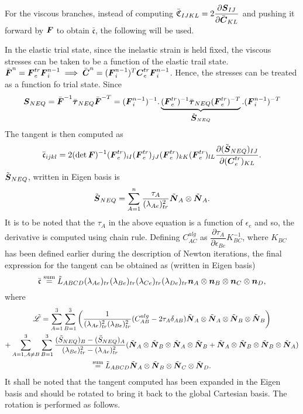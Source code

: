 \documentclass[11pt,twoside,TimesRoman]{article}
\newcommand{\parder}[2]{{\dfrac{\partial #1}{\partial #2}}}
\begin{document}
For the viscous branches, instead of computing $\bar{\mathfrak{C}}_{IJKL} = 2\parder{\bfS_{IJ}}{\bfCbar_{KL}}$ and pushing it forward by $\mbox{\boldmath $F$}$ to obtain $	\bar{\mathfrak{c}}$, the following will be used. 

In the elastic trial state, since the inelastic strain is held fixed, the viscous stresses can be taken to be a function of the elastic trail state. $\bar{\mbox{\boldmath $F$}}^n =\mbox{\boldmath $F$}_e^{tr} \mbox{\boldmath $F$}_i^{n-1} \implies \bar{\mbox{\boldmath $C$}}^n = (\mbox{\boldmath $F$}_i^{n-1})^T \mbox{\boldmath $C$}_e^{tr} \mbox{\boldmath $F$}_i^{n-1}$. Hence, the stresses can be treated as a function fo trial state. Since
\begin{equation}
	 \mbox{\boldmath $S$}_{NEQ}  = \bar{\mbox{\boldmath $F$}}^{-1} \bar{\mbox{\boldmath $\tau$}}_{NEQ} \bar{\mbox{\boldmath $F$}}^{-T} = (\mbox{\boldmath $F$}_i^{n-1})^{-1}.	 \underbrace{(\mbox{\boldmath $F$}_e^{tr})^{-1} \bar{\mbox{\boldmath $\tau$}}_{NEQ} (\mbox{\boldmath $F$}_e^{tr})^{-T}}_{\tilde{\mbox{\boldmath $S$}}_{NEQ}}  .(\mbox{\boldmath $F$}_i^{n-1})^{-T}
\end{equation}
The tangent is then computed as 
\begin{equation}
	\bar{\mathfrak{c}}_{ijkl} =2 (\det \bfF)^{-1} (\bfF_e^{tr})_{iI} (\bfF_e^{tr})_{jJ} (\bfF_e^{tr})_{kK} (\bfF_e^{tr})_{lL} \parder{(\tilde{\bfS}_{NEQ})_{IJ}}{(\bfC_e^{tr})_{KL}}.
\end{equation}
$\tilde{\mbox{\boldmath $S$}}_{NEQ}$, written in Eigen basis is
\begin{equation}
	\tilde{\mbox{\boldmath $S$}}_{NEQ} = \sum_{A=1}^{n} \frac{\tau_A}{(\lambda_{Ae})_{tr}^2} \tilde{\mbox{\boldmath $N$}}_A \otimes \tilde{\mbox{\boldmath $N$}}_A.
\end{equation}
It is to be noted that the $\tau_A$ in the above equation is a function of $\epsilon_e$ and so, the derivative is computed using chain rule. Defining $C^{alg}_{AC}$ as $\parder{\tau_A}{\epsilon_{Be}} K_{BC}^{-1}$, where $K_{BC}$ has been defined earlier during the description of Newton iterations, the final expression for the tangent can be obtained as (written in Eigen basis)
\begin{equation}
 	\bar{\mathfrak{c}} \stackrel{\text{sum}}{=} \tilde{L}_{ABCD} (\lambda_{Ae})_{tr} (\lambda_{Be})_{tr} (\lambda_{Ce})_{tr} (\lambda_{De})_{tr} \mbox{\boldmath $n$}_A \otimes \mbox{\boldmath $n$}_B \otimes \mbox{\boldmath $n$}_C \otimes \mbox{\boldmath $n$}_D,
\end{equation}
where
\begin{multline}
	\tilde{\mathscr{L}} = \sum_{A=1}^{3}\sum_{B=1}^{3}\left(   \frac{1}{(\lambda_{Ae})_{tr}^2(\lambda_{Be})_{tr}^2} (C^{alg}_{AB} - 2\tau_A \delta_{AB}) \tilde{\mbox{\boldmath $N$}}_A \otimes \tilde{\mbox{\boldmath $N$}}_A \otimes \tilde{\mbox{\boldmath $N$}}_B \otimes \tilde{\mbox{\boldmath $N$}}_B  \right) \\
	+ \sum_{A=1,A\neq B}^{3}\sum_{B=1}^{3}\frac{(\tilde{S}_{NEQ})_B-(\tilde{S}_{NEQ})_A}{(\lambda_{Be})_{tr}^2-(\lambda_{Ae})_{tr}^2}(  \tilde{\mbox{\boldmath $N$}}_A \otimes \tilde{\mbox{\boldmath $N$}}_B \otimes \tilde{\mbox{\boldmath $N$}}_A \otimes \tilde{\mbox{\boldmath $N$}}_B  +  \tilde{\mbox{\boldmath $N$}}_A \otimes \tilde{\mbox{\boldmath $N$}}_B \otimes \tilde{\mbox{\boldmath $N$}}_B \otimes \tilde{\mbox{\boldmath $N$}}_A  ) \\
	\stackrel{\text{sum}}{=}  \tilde{L}_{ABCD}\tilde{\mbox{\boldmath $N$}}_A \otimes \tilde{\mbox{\boldmath $N$}}_B \otimes \tilde{\mbox{\boldmath $N$}}_C \otimes \tilde{\mbox{\boldmath $N$}}_D.
\end{multline}
It shall be noted that the tangent computed has been expanded in the Eigen basis and should be rotated to bring it back to the global Cartesian basis. The rotation is performed as follows.
\end{document}
